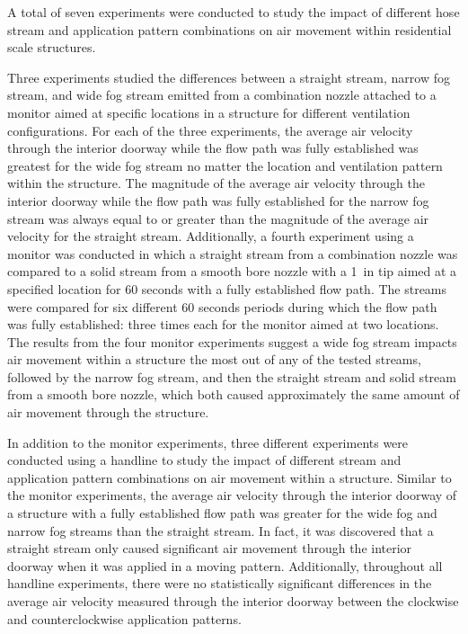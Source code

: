 \documentclass[12pt,oneside]{book}
\begin{document}
A total of seven experiments were conducted to study the impact of different hose stream and application pattern combinations on air movement within residential scale structures. 

Three experiments studied the differences between a straight stream, narrow fog stream, and wide fog stream emitted from a combination nozzle attached to a monitor aimed at specific locations in a structure for different ventilation configurations. For each of the three experiments, the average air velocity through the interior doorway while the flow path was fully established was greatest for the wide fog stream no matter the location and ventilation pattern within the structure. The magnitude of the average air velocity through the interior doorway while the flow path was fully established for the narrow fog stream was always equal to or greater than the magnitude of the average air velocity for the straight stream. Additionally, a fourth experiment using a monitor was conducted in which a straight stream from a combination nozzle was compared to a solid stream from a smooth bore nozzle with a 1~in tip aimed at a specified location for 60 seconds with a fully established flow path. The streams were compared for six different 60 seconds periods during which the flow path was fully established: three times each for the monitor aimed at two locations. The results from the four monitor experiments suggest a wide fog stream impacts air movement within a structure the most out of any of the tested streams, followed by the narrow fog stream, and then the straight stream and solid stream from a smooth bore nozzle, which both caused approximately the same amount of air movement through the structure.

In addition to the monitor experiments, three different experiments were conducted using a handline to study the impact of different stream and application pattern combinations on air movement within a structure. Similar to the monitor experiments, the average air velocity through the interior doorway of a structure with a fully established flow path was greater for the wide fog and narrow fog streams than the straight stream. In fact, it was discovered that a straight stream only caused significant air movement through the interior doorway when it was applied in a moving pattern. Additionally, throughout all handline experiments, there were no statistically significant differences in the average air velocity measured through the interior doorway between the clockwise and counterclockwise application patterns.
\end{document}
